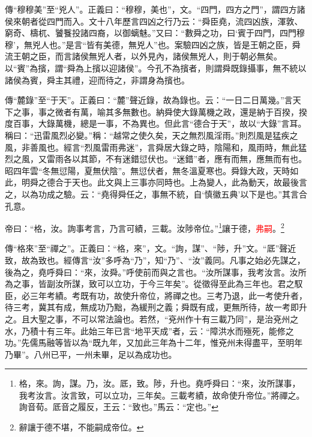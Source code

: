 {\noindent\zhuan{}\fzbyks 傳“穆穆美”至“兇人”。正義曰：“穆穆，美也”，文。“四門，四方之門”，謂四方諸侯來朝者從四門而入。文十八年歷言四凶之行乃云：“舜臣堯，流四凶族，渾敦、窮奇、檮杌、饕餮投諸四裔，以御螭魅。”又曰：“數舜之功，曰‘賓于四門，四門穆穆’，無兇人也。”是言“皆有美德，無兇人”也。案驗四凶之族，皆是王朝之臣，舜流王朝之臣，而言諸侯無兇人者，以外見內，諸侯無兇人，則于朝必無矣。以“賓”為擯，謂“舜為上擯以迎諸侯”。今孔不為擯者，則謂舜既錄攝事，無不統以諸侯為賓，舜主其禮，迎而待之，非謂身為擯也。 \par}

{\noindent\zhuan{}\fzbyks 傳“麓錄”至“于天”。正義曰：“麓”聲近錄，故為錄也。云：“一日二日萬幾。”言天下之事，事之微者有萬，喻其多無數也。納舜使大錄萬機之政，還是納于百揆，揆度百事，大錄萬機，總是一事，不為異也。但此言“德合于天”，故以“大錄”言耳。稱曰：“迅雷風烈必變。”稱：“越常之使久矣，天之無烈風淫雨。”則烈風是猛疾之風，非善風也。經言“烈風雷雨弗迷”，言舜居大錄之時，陰陽和，風雨時，無此猛烈之風，又雷雨各以其節，不有迷錯愆伏也。“迷錯”者，應有而無，應無而有也。昭四年雲“冬無愆陽，夏無伏陰”。無愆伏者，無冬溫夏寒也。舜錄大政，天時如此，明舜之德合于天也。此文與上三事亦同時也。上為變人，此為動天，故最後言之，以為功成之驗。云：“堯得舜任之，事無不統，自‘慎徽五典’以下是也。”其言合孔意。 \par}

帝曰：“格，汝。詢事考言，乃言可績，三載。汝陟帝位。”\footnote{格，來。詢，謀。乃，汝。厎，致。陟，升也。堯呼舜曰：“來，汝所謀事，我考汝言。汝言致，可以立功，三年矣。三載考績，故命使升帝位。”將禪之。詢音荀。厎音之履反，王云：“致也。”馬云：“定也。”}讓于德，\textcolor{red}{弗嗣}。\footnote{辭讓于德不堪，不能嗣成帝位。}

{\noindent\zhuan{}\fzbyks 傳“格來”至“禪之”。正義曰：“格，來”，文。“詢，謀”、“陟，升”文。“厎”聲近致，故為致也。經傳言“汝”多呼為“乃”，知“乃”、“汝”義同。凡事之始必先謀之，後為之，堯呼舜曰：“來，汝舜。”呼使前而與之言也。“汝所謀事，我考汝言。汝所為之事，皆副汝所謀，致可以立功，于今三年矣”。從徵得至此為三年也。君之馭臣，必三年考績。考既有功，故使升帝位，將禪之也。三考乃退，此一考使升者，待三考，冀其有成，無成功乃黜，為緩刑之義；舜既有成，更無所待，故一考即升之。且大聖之事，不可以常法論也。若然，“兗州作十有三載乃同”，是治兗州之水，乃積十有三年。此始三年已言“地平天成”者，云：“障洪水而殛死，能修之功。”先儒馬融等皆以為“既九年，又加此三年為十二年，惟兗州未得盡平，至明年乃畢”。八州已平，一州未畢，足以為成功也。 \par}

